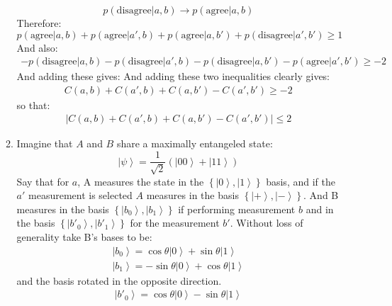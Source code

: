 \documentclass[12pt,a4]{article}
\begin{document}
\begin{enumerate}
\begin{enumerate}
\begin{equation*}
          p(\text{disagree}|a , b) \to p(\text{agree}|a , b)
        \end{equation*}
        Therefore:
        \begin{equation*}
          p(\text{agree}|a, b) + p(\text{agree}|a', b) + p(\text{agree}|a, b') + p(\text{disagree}|a', b') \ge 1
        \end{equation*}
        And also:
        \begin{align*}
         - p(\text{disagree}|a, b) - p(\text{disagree}|a', b) - p(\text{disagree}|a, b') - p(\text{agree}|a', b') \ge -2 
        \end{align*}
        And adding these gives:
        And adding these two inequalities clearly gives:
        \begin{align*}
           C(a, b) + C(a', b) + C(a, b') - C(a', b')
      \ge  -2
        \end{align*}
        so that:
        \begin{align*}
           | C(a, b) + C(a', b) + C(a, b') - C(a', b')| \le 2
        \end{align*}
      \item
        Imagine that $A$ and $B$ share a maximally entangeled state:
        \begin{equation*}
          \left| \psi \right\rangle = \frac{1}{\sqrt{2}}\left(\left| 00 \right \rangle + \left|11\right \rangle\right)
        \end{equation*}
        Say that for $a$, A measures the state in the $\left\{\left|0\right\rangle, \left|1\right\rangle\right\}$ basis, and if the $a'$ measurement is selected $A$ measures in the basis $\left\{\left|+\right\rangle, \left|-\right\rangle\right\}$.
        And B measures in the basis $\left\{\left|b_0\right\rangle, \left|b_1\right\rangle\right\}$ if performing measurement $b$ and in the basis $\left\{\left|b'_0\right\rangle, \left|b'_1\right\rangle\right\}$ for the measurement $b'$.
        Without loss of generality take B's bases to be:
        \begin{align*}
          \left|b_0\right\rangle = \cos \theta \left|0\right\rangle + \sin \theta \left|1\right\rangle\\
          \left|b_1\right\rangle = -\sin \theta \left|0\right\rangle + \cos \theta \left|1\right\rangle
        \end{align*}
        and the basis rotated in the opposite direction.
        \begin{align*}
          \left|b'_0\right\rangle = \cos \theta \left|0\right\rangle - \sin \theta \left|1\right\rangle\\

\end{align*}
\end{enumerate}
\end{enumerate}
\end{document}

